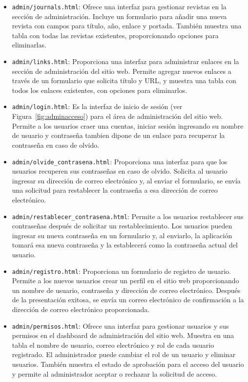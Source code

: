 \documentclass[a4paper, 12pt]{book}
\begin{document}
\begin{itemize}
  \item \texttt{admin/journals.html}: Ofrece una interfaz para gestionar revistas en la sección de administración. Incluye un formulario para añadir una nueva revista con campos para título, año, enlace y portada. También muestra una tabla con todas las revistas existentes, proporcionando opciones para eliminarlas.
  \item \texttt{admin/links.html}: Proporciona una interfaz para administrar enlaces en la sección de administración del sitio web. Permite agregar nuevos enlaces a través de un formulario que solicita título y URL, y muestra una tabla con todos los enlaces existentes, con opciones para eliminarlos.
  \item \texttt{admin/login.html}: Es la interfaz de inicio de sesión (ver Figura~\ref{fig:adminacceso}) para el área de administración del sitio web. Permite a los usuarios craer una cuentas, iniciar sesión ingresando su nombre de usuario y contraseña tambien dipone de un enlace para recuperar la contraseña en caso de olvido.
  \item \texttt{admin/olvide\_contrasena.html}: Proporciona una interfaz para que los usuarios recuperen sus contraseñas en caso de olvido. Solicita al usuario ingresar su dirección de correo electrónico y, al enviar el formulario, se envía una solicitud para restablecer la contraseña a esa dirección de correo electrónico.
  \item \texttt{admin/restablecer\_contrasena.html}: Permite a los usuarios restablecer sus contraseñas después de solicitar un restablecimiento. Los usuarios pueden ingresar su nueva contraseña en un formulario y, al enviarlo, la aplicación tomará esa nueva contraseña y la establecerá como la contraseña actual del usuario.
  \item \texttt{admin/registro.html}: Proporciona un formulario de registro de usuario. Permite a los nuevos usuarios crear un perfil en el sitio web proporcionando un nombre de usuario, contraseña y dirección de correo electrónico. Después de la presentación exitosa, se envía un correo electrónico de confirmación a la dirección de correo electrónico proporcionada.
  \item \texttt{admin/permisos.html}: Ofrece una interfaz para gestionar usuarios y sus permisos en el dashboard de administración del sitio web. Muestra en una tabla el nombre de usuario, correo electrónico y rol de cada usuario registrado. El administrador puede cambiar el rol de un usuario y eliminar usuarios. También muestra el estado de aprobación para el acceso del usuario y permite al administrador aceptar o rechazar la solicitud de acceso.
\end{itemize}
\end{document}

